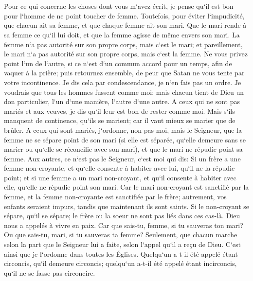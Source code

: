\chapter{}

\verse Pour ce qui concerne les choses dont vous m`avez écrit, je pense qu`il est bon pour l`homme de ne point toucher de femme. 
\verse Toutefois, pour éviter l`impudicité, que chacun ait sa femme, et que chaque femme ait son mari. 
\verse Que le mari rende à sa femme ce qu`il lui doit, et que la femme agisse de même envers son mari. 
\verse La femme n`a pas autorité sur son propre corps, mais c`est le mari; et pareillement, le mari n`a pas autorité sur son propre corps, mais c`est la femme. 
\verse Ne vous privez point l`un de l`autre, si ce n`est d`un commun accord pour un temps, afin de vaquer à la prière; puis retournez ensemble, de peur que Satan ne vous tente par votre incontinence. 
\verse Je dis cela par condescendance, je n`en fais pas un ordre. 
\verse Je voudrais que tous les hommes fussent comme moi; mais chacun tient de Dieu un don particulier, l`un d`une manière, l`autre d`une autre. 
\verse A ceux qui ne sont pas mariés et aux veuves, je dis qu`il leur est bon de rester comme moi. 
\verse Mais s`ils manquent de continence, qu`ils se marient; car il vaut mieux se marier que de brûler. 
\verse A ceux qui sont mariés, j`ordonne, non pas moi, mais le Seigneur, que la femme ne se sépare point de son mari 
\verse (si elle est séparée, qu`elle demeure sans se marier ou qu`elle se réconcilie avec son mari), et que le mari ne répudie point sa femme. 
\verse Aux autres, ce n`est pas le Seigneur, c`est moi qui dis: Si un frère a une femme non-croyante, et qu`elle consente à habiter avec lui, qu`il ne la répudie point; 
\verse et si une femme a un mari non-croyant, et qu`il consente à habiter avec elle, qu`elle ne répudie point son mari. 
\verse Car le mari non-croyant est sanctifié par la femme, et la femme non-croyante est sanctifiée par le frère; autrement, vos enfants seraient impurs, tandis que maintenant ils sont saints. 
\verse Si le non-croyant se sépare, qu`il se sépare; le frère ou la soeur ne sont pas liés dans ces cas-là. Dieu nous a appelés à vivre en paix. 
\verse Car que sais-tu, femme, si tu sauveras ton mari? Ou que sais-tu, mari, si tu sauveras ta femme? 
\verse Seulement, que chacun marche selon la part que le Seigneur lui a faite, selon l`appel qu`il a reçu de Dieu. C`est ainsi que je l`ordonne dans toutes les Églises. 
\verse Quelqu`un a-t-il été appelé étant circoncis, qu`il demeure circoncis; quelqu`un a-t-il été appelé étant incirconcis, qu`il ne se fasse pas circoncire. 
